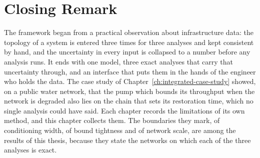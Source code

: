 \documentclass[12pt]{report}
\begin{document}
\section{Closing Remark}
\label{sec:concl-closing}

The framework began from a practical observation about infrastructure data: the topology
of a system is entered three times for three analyses and kept consistent by hand, and the
uncertainty in every input is collapsed to a number before any analysis runs. It ends with
one model, three exact analyses that carry that uncertainty through, and an interface that
puts them in the hands of the engineer who holds the data. The case study of
Chapter~\ref{ch:integrated-case-study} showed, on a public water network, that the pump
which bounds its throughput when the network is degraded also lies on the chain that sets its
restoration time, which no single analysis could have said. Each
chapter records the limitations of its own method, and this chapter collects them. The
boundaries they mark, of conditioning width, of bound tightness and of network scale, are
among the results of this thesis, because they state the networks on which each of the
three analyses is exact.

\ifdefined\maindoc
\else
\printbibliography
\end{document}
